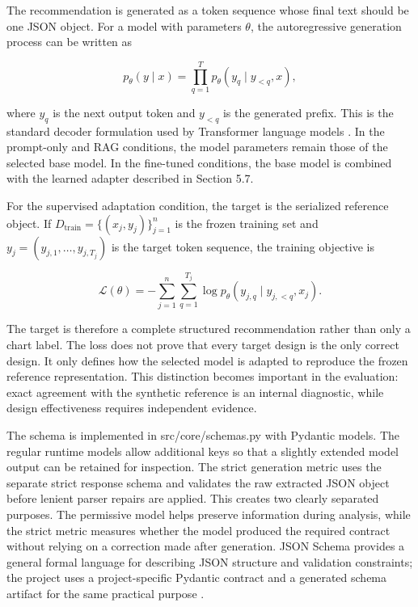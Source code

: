The recommendation is generated as a token sequence whose final text should be one JSON object. For a model with parameters \(\theta\), the autoregressive generation process can be written as

\[
p_{\theta}(y \mid x) =
\prod_{q=1}^{T}
p_{\theta}(y_q \mid y_{<q}, x),
\]

where \(y_q\) is the next output token and \(y_{<q}\) is the generated prefix. This is the standard decoder formulation used by Transformer language models \cite{vaswani2017attention}. In the prompt-only and RAG conditions, the model parameters remain those of the selected base model. In the fine-tuned conditions, the base model is combined with the learned adapter described in Section 5.7.

For the supervised adaptation condition, the target is the serialized reference object. If \(D_{\mathrm{train}}=\{(x_j,y_j)\}_{j=1}^{n}\) is the frozen training set and \(y_j=(y_{j,1},\ldots,y_{j,T_j})\) is the target token sequence, the training objective is

\[
\mathcal{L}(\theta) =
-\sum_{j=1}^{n}\sum_{q=1}^{T_j}
\log p_{\theta}(y_{j,q}\mid y_{j,<q},x_j).
\]

The target is therefore a complete structured recommendation rather than only a chart label. The loss does not prove that every target design is the only correct design. It only defines how the selected model is adapted to reproduce the frozen reference representation. This distinction becomes important in the evaluation: exact agreement with the synthetic reference is an internal diagnostic, while design effectiveness requires independent evidence.

The schema is implemented in src/core/schemas.py with Pydantic models. The regular runtime models allow additional keys so that a slightly extended model output can be retained for inspection. The strict generation metric uses the separate strict response schema and validates the raw extracted JSON object before lenient parser repairs are applied. This creates two clearly separated purposes. The permissive model helps preserve information during analysis, while the strict metric measures whether the model produced the required contract without relying on a correction made after generation. JSON Schema provides a general formal language for describing JSON structure and validation constraints; the project uses a project-specific Pydantic contract and a generated schema artifact for the same practical purpose \cite{jsonschema2022draft}.

